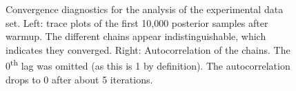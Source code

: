 \documentclass[a4paper]{article}
\begin{document}
\begin{figure}[!ht]
\begin{subfigure}{.5\textwidth}
	\end{subfigure}%
	\caption{
		Convergence diagnostics for the analysis of the experimental data set.
		Left: trace plots of the first 10,000 posterior samples after warmup. The different chains appear indistinguishable, which indicates they converged. Right: Autocorrelation of the chains. The 0\textsuperscript{th} lag was omitted (as this is 1 by definition). The autocorrelation drops to 0 after about 5 iterations.}
	\label{fig:experimentalPosteriorDiagnostics}
\end{figure}
\end{document}

